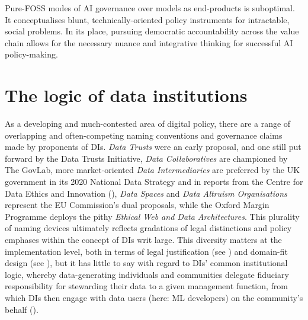 Pure-FOSS modes of AI governance over models as end-products is suboptimal. It conceptualises blunt, technically-oriented policy instruments for intractable, social problems. In its place, pursuing democratic accountability across the value chain allows for the necessary nuance and integrative thinking for successful AI policy-making.

\section*{The logic of data institutions}

As a developing and much-contested area of digital policy, there are a range of overlapping and often-competing naming conventions and governance claims made by proponents of DIs. \textit{Data Trusts} were an early proposal, and one still put forward by the Data Trusts Initiative, \textit{Data Collaboratives} are championed by The GovLab, more market-oriented \textit{Data Intermediaries} are preferred by the UK government in its 2020 National Data Strategy and in reports from the Centre for Data Ethics and Innovation (\citeyear{2019CentreDataEthics}), \textit{Data Spaces} and \textit{Data Altruism Organisations} represent the EU Commission's dual proposals, while the Oxford Margin Programme deploys the pithy \textit{Ethical Web and Data Architectures}. This plurality of naming devices ultimately reflects gradations of legal distinctions and policy emphases within the concept of DIs writ large. This diversity matters at the implementation level, both in terms of legal justification (see \textcite{ohara2020DataTrusts, olorunju2023AfricanDataTrusts}) and  domain-fit design (see \textcite{delacroix2019BottomupDataTrusts, DesigningTrustworthyData}), but it has little to say with regard to DIs' common institutional logic, whereby data-generating individuals and communities delegate fiduciary responsibility for stewarding their data to a given management function, from which DIs then engage with data users (here: ML developers) on the community's behalf (\cite{2021HowDataInstitutionsa}).

